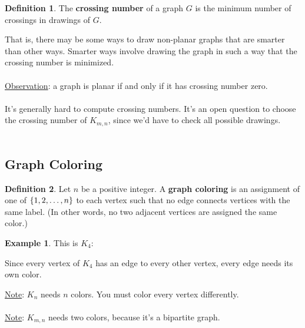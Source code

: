 \documentclass[]{article}
\theoremstyle{definition}
\newtheorem*{defn}{Definition}
\newtheorem{ex}{Example}[section]
\DeclarePairedDelimiter{\set}{\lbrace}{\rbrace}
\begin{document}
				\begin{defn}
					The \textbf{crossing number} of a graph $G$ is the minimum number of crossings in drawings of $G$.
				\end{defn}
				
				That is, there may be some ways to draw non-planar graphs that are smarter than other ways. Smarter ways involve drawing the graph in such a way that the crossing number is minimized.
				\\ \\
				\underline{Observation}: a graph is planar if and only if it has crossing number zero.
				\\ \\
				It's generally hard to compute crossing numbers. It's an open question to choose the crossing number of $K_{m, n}$, since we'd have to check all possible drawings.
				\\ \\
		\subsection{Graph Coloring}
			\begin{defn}
				Let $n$ be a positive integer. A \textbf{graph coloring} is an assignment of one of $\set{1, 2, \ldots, n}$ to each vertex such that no edge connects vertices with the same label. (In other words, no two adjacent vertices are assigned the same color.)
			\end{defn}
			
			\begin{ex}
				This is $K_4$:
				\begin{center}
				\end{center}
			
				Since every vertex of $K_4$ has an edge to every other vertex, every edge needs its own color.
			\end{ex}

			\underline{Note}: $K_n$ needs $n$ colors. You must color every vertex differently.
			\\ \\
			\underline{Note}: $K_{m, n}$ needs two colors, because it's a bipartite graph.
			
\end{document}

